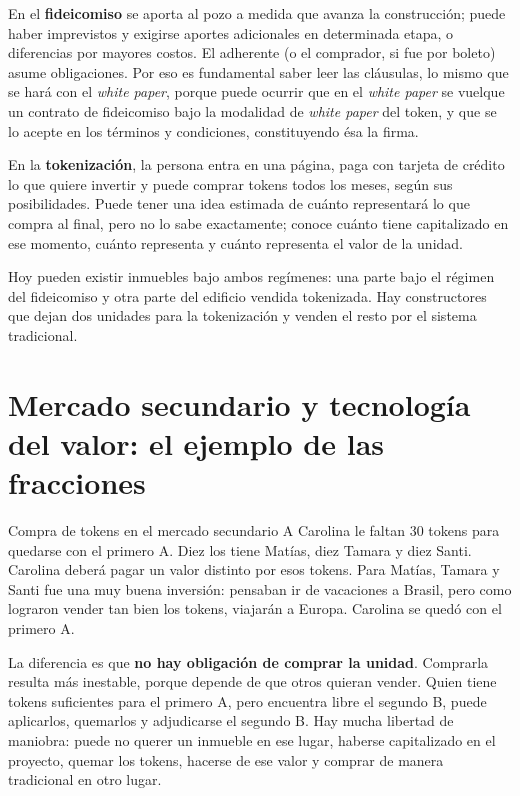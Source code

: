\documentclass[12pt,oneside]{book}
\begin{document}
En el \textbf{fideicomiso} se aporta al pozo a medida que avanza la construcción; puede haber imprevistos y exigirse aportes adicionales en determinada etapa, o diferencias por mayores costos. El adherente (o el comprador, si fue por boleto) asume obligaciones. Por eso es fundamental saber leer las cláusulas, lo mismo que se hará con el \textit{white paper}, porque puede ocurrir que en el \textit{white paper} se vuelque un contrato de fideicomiso bajo la modalidad de \textit{white paper} del token, y que se lo acepte en los términos y condiciones, constituyendo ésa la firma.

En la \textbf{tokenización}, la persona entra en una página, paga con tarjeta de crédito lo que quiere invertir y puede comprar tokens todos los meses, según sus posibilidades. Puede tener una idea estimada de cuánto representará lo que compra al final, pero no lo sabe exactamente; conoce cuánto tiene capitalizado en ese momento, cuánto representa y cuánto representa el valor de la unidad.

Hoy pueden existir inmuebles bajo ambos regímenes: una parte bajo el régimen del fideicomiso y otra parte del edificio vendida tokenizada. Hay constructores que dejan dos unidades para la tokenización y venden el resto por el sistema tradicional.

\section{Mercado secundario y tecnología del valor: el ejemplo de las fracciones}

\begin{example}{Compra de tokens en el mercado secundario}
A Carolina le faltan 30 tokens para quedarse con el primero A. Diez los tiene Matías, diez Tamara y diez Santi. Carolina deberá pagar un valor distinto por esos tokens. Para Matías, Tamara y Santi fue una muy buena inversión: pensaban ir de vacaciones a Brasil, pero como lograron vender tan bien los tokens, viajarán a Europa. Carolina se quedó con el primero A.
\end{example}

La diferencia es que \textbf{no hay obligación de comprar la unidad}. Comprarla resulta más inestable, porque depende de que otros quieran vender. Quien tiene tokens suficientes para el primero A, pero encuentra libre el segundo B, puede aplicarlos, quemarlos y adjudicarse el segundo B. Hay mucha libertad de maniobra: puede no querer un inmueble en ese lugar, haberse capitalizado en el proyecto, quemar los tokens, hacerse de ese valor y comprar de manera tradicional en otro lugar.
\end{document}
